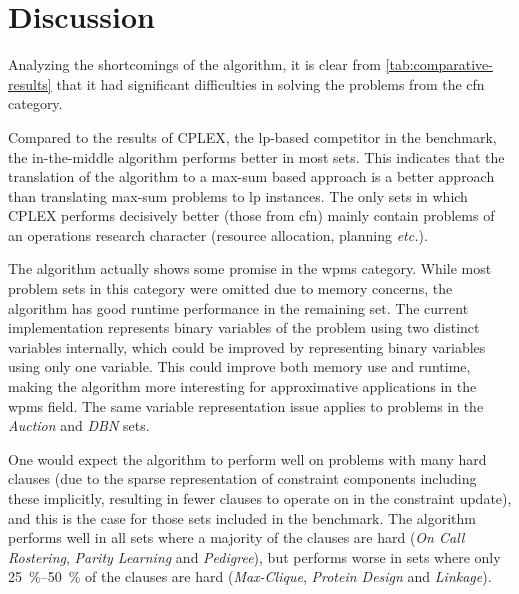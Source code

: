 \section{Discussion}




Analyzing the shortcomings of the algorithm, it is clear from \cref{tab:comparative-results} that it had significant difficulties in solving the problems from the \gls{cfn} category.


Compared to the results of CPLEX, the \gls{lp}-based competitor in the benchmark, the in-the-middle algorithm performs better in most sets.
This indicates that the translation of the algorithm to a max-sum based approach is a better approach than translating max-sum problems to \gls{lp} instances.
The only sets in which CPLEX performs decisively better (those from \gls{cfn}) mainly contain problems of an operations research character (resource allocation, planning \emph{etc.}).

The algorithm actually shows some promise in the \gls{wpms} category.
While most problem sets in this category were omitted due to memory concerns, the algorithm has good runtime performance in the remaining set.
The current implementation represents binary variables of the problem using two distinct variables internally, which could be improved by representing binary variables using only one variable.
This could improve both memory use and runtime, making the algorithm more interesting for approximative applications in the \gls{wpms} field.
The same variable representation issue applies to problems in the \emph{Auction} and \emph{DBN} sets.

One would expect the algorithm to perform well on problems with many hard clauses (due to the sparse representation of constraint components including these implicitly, resulting in fewer clauses to operate on in the constraint update), and this is the case for those sets included in the benchmark.
The algorithm performs well in all sets where a majority of the clauses are hard (\emph{On Call Rostering}, \emph{Parity Learning} and \emph{Pedigree}), but performs worse in sets where only \SIrange{25}{50}{\percent} of the clauses are hard (\emph{Max-Clique}, \emph{Protein Design} and \emph{Linkage}).

